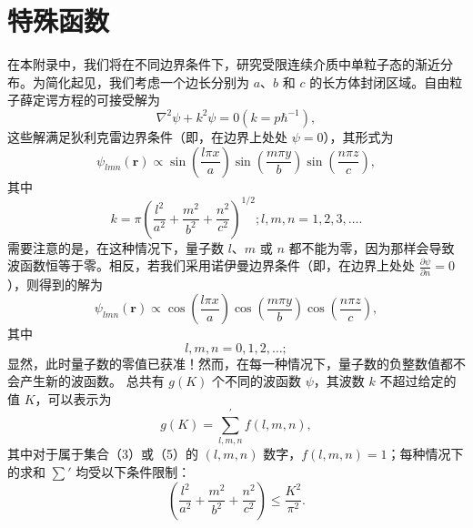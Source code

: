 ﻿\section{特殊函数}

在本附录中，我们将在不同边界条件下，研究受限连续介质中单粒子态的渐近分布。为简化起见，我们考虑一个边长分别为 \(a\)、\(b\) 和 \(c\) 的长方体封闭区域。自由粒子薛定谔方程的可接受解为
\begin{equation}\tag{17.1.1}\label{eq:17.1.1}
\nabla ^{2} \psi + k ^{2} \psi = 0  \left( k = p \hbar ^{- 1} \right) ,
\end{equation}
这些解满足狄利克雷边界条件（即，在边界上处处 \(\psi=0\)），其形式为
\begin{equation}\tag{17.1.2}\label{eq:17.1.2}
\psi _ { l m n } ( \pmb { r } ) \propto \sin \left( \frac { l \pi x } { a } \right) \sin \left( \frac { m \pi y } { b } \right) \sin \left( \frac { n \pi z } { c } \right) ,
\end{equation}
其中
\begin{equation}\tag{17.1.3}\label{eq:17.1.3}
k = \pi \left( \frac { l ^{2} } { a ^{2} } + \frac { m ^{2} } { b ^{2} } + \frac { n ^{2} } { c ^{2} } \right) ^{1 / 2} ;  l , m , n = 1 , 2 , 3 , \ldots .
\end{equation}
需要注意的是，在这种情况下，量子数 \(l\)、\(m\) 或 \(n\) 都不能为零，因为那样会导致波函数恒等于零。相反，若我们采用诺伊曼边界条件（即，在边界上处处 \(\frac{\partial\psi}{\partial n}=0\)），则得到的解为
\begin{equation}\tag{17.1.4}\label{eq:17.1.4}
\psi _ { l m n } ( \pmb { r } ) \propto \cos \left( \frac { l \pi x } { a } \right) \cos \left( \frac { m \pi y } { b } \right) \cos \left( \frac { n \pi z } { c } \right) ,
\end{equation}
其中
\begin{equation}\tag{17.1.5}\label{eq:17.1.5}
l , m , n = 0 , 1 , 2 , \ldots ;
\end{equation}
显然，此时量子数的零值已获准！然而，在每一种情况下，量子数的负整数值都不会产生新的波函数。
总共有 \(g(K)\) 个不同的波函数 \(\psi\)，其波数 \(k\) 不超过给定的值 \(K\)，可以表示为
\begin{equation}\tag{17.1.6}\label{eq:17.1.6}
g ( K ) = \sum _ { l , m , n } ^{\prime} f ( l , m , n ) ,
\end{equation}
其中对于属于集合（3）或（5）的 \((l,m,n)\) 数字，\(f(l,m,n)=1\)；每种情况下的求和 \(\sum'\) 均受以下条件限制：
\begin{equation}\tag{17.1.7}\label{eq:17.1.7}
\left( \frac { l ^{2} } { a ^{2} } + \frac { m ^{2} } { b ^{2} } + \frac { n ^{2} } { c ^{2} } \right) \leq \frac { K ^{2} } { \pi ^{2} } .
\end{equation}
